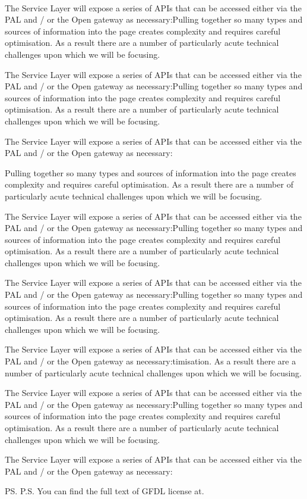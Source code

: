 \documentclass[10pt, paper=A4, parskip=full,asymTypB,
               enlargefirstpage ]{scrlttr2}
\begin{document}
\begin{letter}{%
\tystrrecipient \\
\tystrrecipientaddress
}
The Service Layer will expose a series of APIs that can be accessed either via the PAL and / or the Open gateway as necessary:Pulling together so many types and sources of information into the page creates complexity and requires careful optimisation. As a result there are a number of particularly acute technical challenges upon which we will be focusing.

The Service Layer will expose a series of APIs that can be accessed either via the PAL and / or the Open gateway as necessary:Pulling together so many types and sources of information into the page creates complexity and requires careful optimisation. As a result there are a number of particularly acute technical challenges upon which we will be focusing.

The Service Layer will expose a series of APIs that can be accessed either via the PAL and / or the Open gateway as necessary:

Pulling together so many types and sources of information into the page creates complexity and requires careful optimisation. As a result there are a number of particularly acute technical challenges upon which we will be focusing.

The Service Layer will expose a series of APIs that can be accessed either via the PAL and / or the Open gateway as necessary:Pulling together so many types and sources of information into the page creates complexity and requires careful optimisation. As a result there are a number of particularly acute technical challenges upon which we will be focusing.

The Service Layer will expose a series of APIs that can be accessed either via the PAL and / or the Open gateway as necessary:Pulling together so many types and sources of information into the page creates complexity and requires careful optimisation. As a result there are a number of particularly acute technical challenges upon which we will be focusing.

The Service Layer will expose a series of APIs that can be accessed either via the PAL and / or the Open gateway as necessary:timisation. As a result there are a number of particularly acute technical challenges upon which we will be focusing.

The Service Layer will expose a series of APIs that can be accessed either via the PAL and / or the Open gateway as necessary:Pulling together so many types and sources of information into the page creates complexity and requires careful optimisation. As a result there are a number of particularly acute technical challenges upon which we will be focusing.

The Service Layer will expose a series of APIs that can be accessed either via the PAL and / or the Open gateway as necessary:

\closing{\tystrclosing}
\ps{P.S. You can find the full text of GFDL license at.}
\end{letter}
\end{document}
